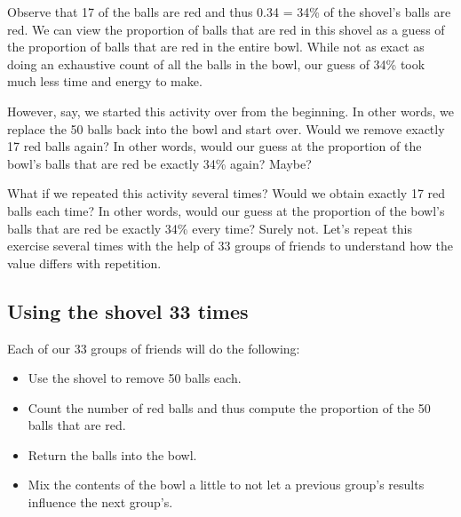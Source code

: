 \documentclass[
]{book}
\providecommand{\tightlist}{%
  \setlength{\itemsep}{0pt}\setlength{\parskip}{0pt}}
\begin{document}
Observe that 17 of the balls are red and thus 0.34 = 34\% of the shovel's balls are red. We can view the proportion of balls that are red in this shovel as a guess of the proportion of balls that are red in the entire bowl. While not as exact as doing an exhaustive count of all the balls in the bowl, our guess of 34\% took much less time and energy to make.

However, say, we started this activity over from the beginning. In other words, we replace the 50 balls back into the bowl and start over. Would we remove exactly 17 red balls again? In other words, would our guess at the proportion of the bowl's balls that are red be exactly 34\% again? Maybe?

What if we repeated this activity several times? Would we obtain exactly 17 red balls each time? In other words, would our guess at the proportion of the bowl's balls that are red be exactly 34\% every time? Surely not. Let's repeat this exercise several times with the help of 33 groups of friends to understand how the value differs with repetition.

\hypertarget{student-shovels}{%
\subsection{Using the shovel 33 times}\label{student-shovels}}

Each of our 33 groups of friends will do the following:

\begin{itemize}
\tightlist
\item
  Use the shovel to remove 50 balls each.
\item
  Count the number of red balls and thus compute the proportion of the 50 balls that are red.
\item
  Return the balls into the bowl.
\item
  Mix the contents of the bowl a little to not let a previous group's results influence the next group's.
\end{itemize}
\end{document}
